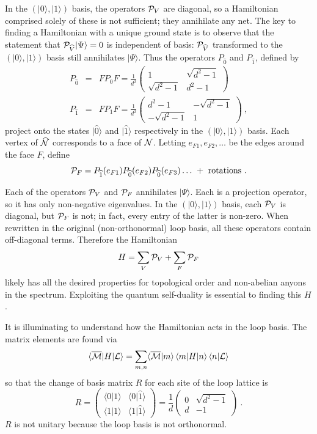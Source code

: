 \documentclass[11pt]{article}
\newcommand{\wwr}{|\widehat{0}\rangle}
\newcommand{\xxr}{|\widehat{1}\rangle}
\newcommand{\Nhat}{\widehat{\cal N}}
\begin{document}
In the $(|0\rangle,|1\rangle)$ basis, the operators ${\cal P}_V$ are
diagonal, so a Hamiltonian comprised solely of these is not
sufficient; they annihilate any net. The key to finding a Hamiltonian
with a unique ground state is to observe that the statement that
${\cal P}_{\widehat{V}} |\Psi\rangle =0$ is independent of
basis: ${\cal P}_{\widehat{V}}$ transformed to the
$(|0\rangle,|1\rangle)$ basis still annihilates $|\Psi\rangle$.  Thus
the operators $P_{\widehat{0}}$ and $P_{\widehat{1}}$, defined by
\begin{eqnarray*}
P_{\widehat{0}} &=& FP_0 F = 
\frac{1}{d^2}
\begin{pmatrix}
1& \sqrt{d^2-1}\\
\sqrt{d^2-1}& d^2-1
\end{pmatrix}
\\
P_{\widehat{1}} &=& FP_1 F=
\frac{1}{d^2}
\begin{pmatrix}
d^2-1 & -\sqrt{d^2-1}\\
-\sqrt{d^2-1} & 1
\end{pmatrix}\ ,
\end{eqnarray*}
project onto the states $\wwr$
and $\xxr$ respectively in the $(|0\rangle,|1\rangle)$ basis.
Each vertex of $\Nhat$ corresponds to a face of ${\cal
  N}$. Letting $e_{F1},e_{F2},\dots$ be the edges around the face $F$, define
\begin{equation}
{\cal P}_{F} = P_{\widehat{1}}(e_{F1}) 
P_{\widehat{0}}(e_{F2}) P_{\widehat{0}}(e_{F3})\dots\
 + \hbox{ rotations}\ .
\end{equation}

Each of the operators ${\cal P}_V$ and ${\cal P}_F$ annihilates
$|\Psi\rangle$. Each is a projection operator, so it has only
non-negative eigenvalues. In the $(|0\rangle,|1\rangle)$ basis, each 
${\cal P}_V$ is diagonal, but ${\cal P}_F$ is not; in fact, every entry of
the latter is non-zero. When rewritten in the 
original (non-orthonormal) loop basis, all these operators contain
off-diagonal terms. Therefore the Hamiltonian
\begin{equation}
H= \sum_V {\cal P}_V + \sum_F {\cal P}_F
\label{ham}
\end{equation}
likely has all the desired properties for topological order and
non-abelian anyons in the spectrum. Exploiting the quantum
self-duality is essential to finding this $H$.  

It is illuminating to understand how the Hamiltonian acts in the loop
basis.  The matrix elements are found via
$$\langle \overline{\cal M}|H|{\cal L}\rangle = \sum_{m,n}
\langle \overline{\cal M}|m\rangle\,\langle m|H|n\rangle\,
\langle n|{\cal L}\rangle$$ 
so that the change of basis matrix $R$ for each site of the loop
lattice is 
$$R=
\begin{pmatrix}
\langle 0|1\rangle & \langle 0\xxr \\
\langle 1|1\rangle & \langle 1\xxr 
\end{pmatrix}
=\frac{1}{d}
\begin{pmatrix}
0 & \sqrt{d^2-1}\\
d & -1
\end{pmatrix}\ .
$$
$R$ is not unitary because the loop basis is not
orthonormal. 
\end{document}
